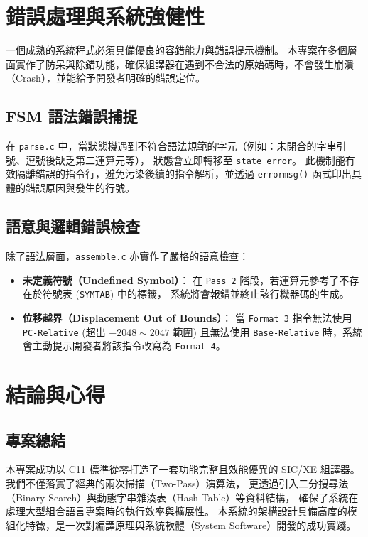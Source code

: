 \chapter{錯誤處理與系統強健性}

一個成熟的系統程式必須具備優良的容錯能力與錯誤提示機制。
本專案在多個層面實作了防呆與除錯功能，確保組譯器在遇到不合法的原始碼時，不會發生崩潰（Crash），並能給予開發者明確的錯誤定位。

\section{FSM 語法錯誤捕捉}
在 \lstinline{parse.c} 中，當狀態機遇到不符合語法規範的字元（例如：未閉合的字串引號、逗號後缺乏第二運算元等），
狀態會立即轉移至 \lstinline{state_error}。
此機制能有效隔離錯誤的指令行，避免污染後續的指令解析，並透過 \lstinline{errormsg()} 函式印出具體的錯誤原因與發生的行號。

\section{語意與邏輯錯誤檢查}
除了語法層面，\lstinline{assemble.c} 亦實作了嚴格的語意檢查：
\begin{itemize}
    \item \textbf{未定義符號（Undefined Symbol）}：
          在 \lstinline{Pass 2} 階段，若運算元參考了不存在於符號表 (\lstinline{SYMTAB}) 中的標籤，
          系統將會報錯並終止該行機器碼的生成。
    \item \textbf{位移越界（Displacement Out of Bounds）}：
          當 \lstinline{Format 3} 指令無法使用 \lstinline{PC-Relative} (超出 $-2048 \sim 2047$ 範圍)
          且無法使用 \lstinline{Base-Relative} 時，系統會主動提示開發者將該指令改寫為 \lstinline{Format 4}。
\end{itemize}

\chapter{結論與心得}

\section{專案總結}
本專案成功以 C11 標準從零打造了一套功能完整且效能優異的 SIC/XE 組譯器。
我們不僅落實了經典的兩次掃描（Two-Pass）演算法，
更透過引入二分搜尋法（Binary Search）與動態字串雜湊表（Hash Table）等資料結構，
確保了系統在處理大型組合語言專案時的執行效率與擴展性。
本系統的架構設計具備高度的模組化特徵，是一次對編譯原理與系統軟體（System Software）開發的成功實踐。

